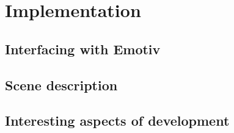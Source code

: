 \chapter{Implementation}
\label{cha:implementation}

\section{Interfacing with Emotiv}

\section{Scene description}

\section{Interesting aspects of development}